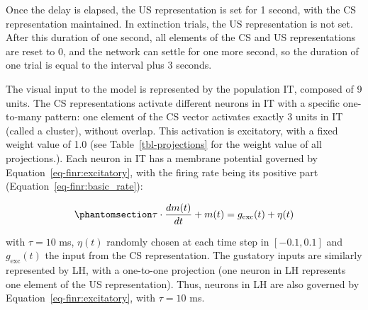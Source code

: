 \documentclass[
  11pt,
  a4paper,
]{scrbook}
\begin{document}
Once the delay is elapsed, the US representation is set for 1 second,
with the CS representation maintained. In extinction trials, the US
representation is not set. After this duration of one second, all
elements of the CS and US representations are reset to 0, and the
network can settle for one more second, so the duration of one trial is
equal to the interval plus 3 seconds.

The visual input to the model is represented by the population IT,
composed of 9 units. The CS representations activate different neurons
in IT with a specific one-to-many pattern: one element of the CS vector
activates exactly 3 units in IT (called a cluster), without overlap.
This activation is excitatory, with a fixed weight value of 1.0 (see
Table~\ref{tbl-projections} for the weight value of all projections.).
Each neuron in IT has a membrane potential governed by
Equation~\ref{eq-finr:excitatory}, with the firing rate being its
positive part (Equation~\ref{eq-finr:basic_rate}):

\begin{equation}\phantomsection\label{eq-finr:excitatory}{
    \tau \cdot \frac{dm(t)}{dt} +  m(t) = g_{\text{exc}}(t) + \eta(t)
}\end{equation}

with \(\tau = 10\) ms, \(\eta(t)\) randomly chosen at each time step in
\([-0.1, 0.1]\) and \(g_{\text{exc}}(t)\) the input from the CS
representation. The gustatory inputs are similarly represented by LH,
with a one-to-one projection (one neuron in LH represents one element of
the US representation). Thus, neurons in LH are also governed by
Equation~\ref{eq-finr:excitatory}, with \(\tau = 10\) ms.
\end{document}
